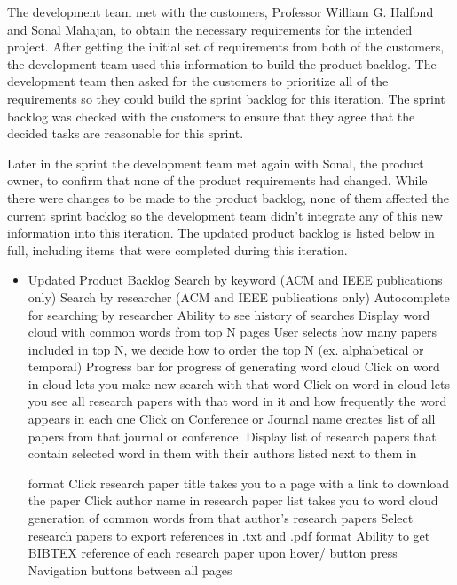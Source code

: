 \documentclass[]{article}
\begin{document}
The development team met with the customers, Professor William G.
Halfond and Sonal Mahajan, to obtain the necessary requirements for the
intended project. After getting the initial set of requirements from
both of the customers, the development team used this information to
build the product backlog. The development team then asked for the
customers to prioritize all of the requirements so they could build the
sprint backlog for this iteration. The sprint backlog was checked with
the customers to ensure that they agree that the decided tasks are
reasonable for this sprint.

Later in the sprint the development team met again with Sonal, the
product owner, to confirm that none of the product requirements had
changed. While there were changes to be made to the product backlog,
none of them affected the current sprint backlog so the development team
didn't integrate any of this new information into this iteration. The
updated product backlog is listed below in full, including items that
were completed during this iteration.

\begin{itemize}
\itemsep1pt\parskip0pt
\item
  Updated Product Backlog Search by keyword (ACM and IEEE publications
  only) Search by researcher (ACM and IEEE publications only)
  Autocomplete for searching by researcher Ability to see history of
  searches Display word cloud with common words from top N pages User
  selects how many papers included in top N, we decide how to order the
  top N (ex. alphabetical or temporal) Progress bar for progress of
  generating word cloud Click on word in cloud lets you make new search
  with that word Click on word in cloud lets you see all research papers
  with that word in it and how frequently the word appears in each one
  Click on Conference or Journal name creates list of all papers from
  that journal or conference. Display list of research papers that
  contain selected word in them with their authors listed next to them
  in

  format Click research paper title takes you to a page with a link to
  download the paper Click author name in research paper list takes you
  to word cloud generation of common words from that author's research
  papers Select research papers to export references in .txt and .pdf
  format Ability to get BIBTEX reference of each research paper upon
  hover/ button press Navigation buttons between all pages
\end{itemize}
\end{document}
